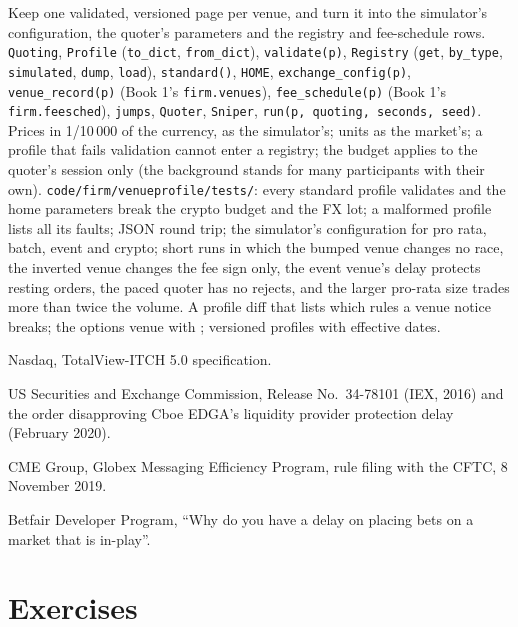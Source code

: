 \begin{build}
 Keep one validated, versioned page per venue, and turn it into the simulator's configuration, the quoter's parameters and the
registry and fee-schedule rows.
 \texttt{Quoting}, \texttt{Profile} (\texttt{to\_dict}, \texttt{from\_dict}), \texttt{validate(p)}, \texttt{Registry} (\texttt{get},
\texttt{by\_type}, \texttt{simulated}, \texttt{dump}, \texttt{load}), \texttt{standard()}, \texttt{HOME}, \texttt{exchange\_config(p)},
\texttt{venue\_record(p)} (Book 1's \texttt{firm.venues}), \texttt{fee\_schedule(p)} (Book 1's \texttt{firm.feesched}), \texttt{jumps},
\texttt{Quoter}, \texttt{Sniper}, \texttt{run(p, quoting, seconds, seed)}.
 Prices in 1/10\,000 of the currency, as the simulator's; units as the market's; a profile that fails validation cannot enter a
registry; the budget applies to the quoter's session only (the background stands for many participants with their own).
 \texttt{code/firm/venueprofile/tests/}: every standard profile validates and the home parameters break the crypto budget
and the FX lot; a malformed profile lists all its faults; JSON round trip; the simulator's configuration for pro rata, batch, event and crypto; short
runs in which the bumped venue changes no race, the inverted venue changes the fee sign only, the event venue's delay protects resting orders, the
paced quoter has no rejects, and the larger pro-rata size trades more than twice the volume.
 A profile diff that lists which rules a venue notice breaks; the options venue with ; versioned profiles with effective
dates.
\end{build}

\begin{omsources}
\item Nasdaq, TotalView-ITCH 5.0 specification.
\item US Securities and Exchange Commission, Release No.\ 34-78101 (IEX, 2016) and the order disapproving Cboe EDGA's liquidity provider protection
delay (February 2020).
\item CME Group, Globex Messaging Efficiency Program, rule filing with the CFTC, 8 November 2019.
\item Betfair Developer Program, ``Why do you have a delay on placing bets on a market that is in-play''.
\end{omsources}

\section{Exercises}

